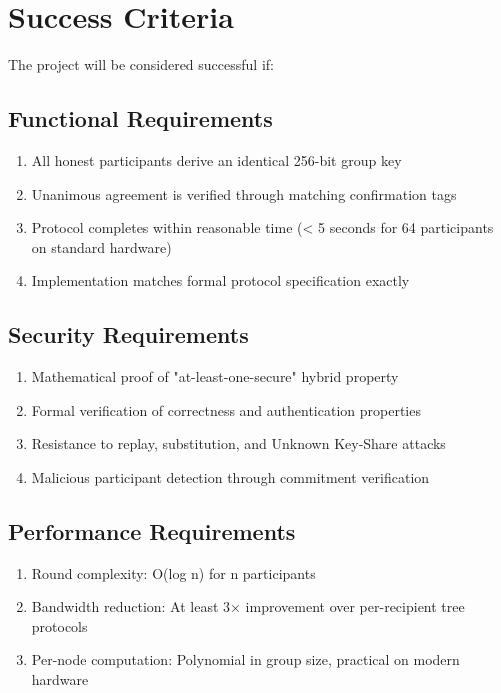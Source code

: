 \documentclass[12pt,a4paper]{report}
\begin{document}
\section{Success Criteria}

The project will be considered successful if:

\subsection{Functional Requirements}
\begin{enumerate}
\item All honest participants derive an identical 256-bit group key
\item Unanimous agreement is verified through matching confirmation tags
\item Protocol completes within reasonable time (< 5 seconds for 64 participants on standard hardware)
\item Implementation matches formal protocol specification exactly
\end{enumerate}

\subsection{Security Requirements}
\begin{enumerate}
\item Mathematical proof of "at-least-one-secure" hybrid property
\item Formal verification of correctness and authentication properties
\item Resistance to replay, substitution, and Unknown Key-Share attacks
\item Malicious participant detection through commitment verification
\end{enumerate}

\subsection{Performance Requirements}
\begin{enumerate}
\item Round complexity: O(log n) for n participants
\item Bandwidth reduction: At least 3× improvement over per-recipient tree protocols
\item Per-node computation: Polynomial in group size, practical on modern hardware
\end{enumerate}
\end{document}
